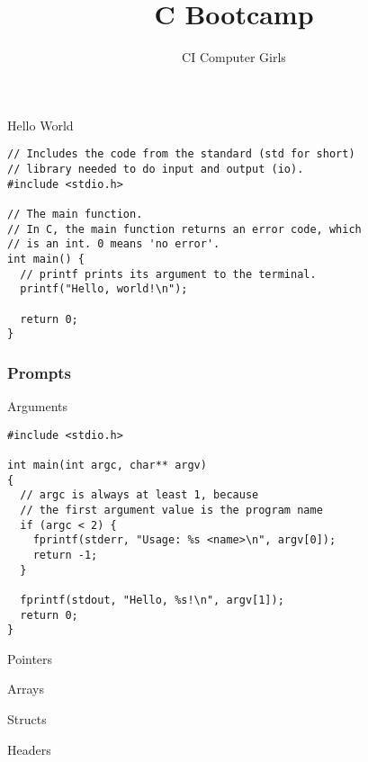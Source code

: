 \documentclass[pdf]{beamer}
\title{C Bootcamp}
\author{CI Computer Girls}
\begin{document}
\begin{frame}
  \titlepage%
\end{frame}

\begin{frame}[fragile]{Hello World}

\begin{verbatim}
// Includes the code from the standard (std for short)
// library needed to do input and output (io).
#include <stdio.h>

// The main function.
// In C, the main function returns an error code, which
// is an int. 0 means 'no error'.
int main() {
  // printf prints its argument to the terminal.
  printf("Hello, world!\n");

  return 0;
}
\end{verbatim}

\end{frame}

\begin{frame}
\frametitle{Prompts}

\end{frame}

\begin{frame}[fragile]{Arguments}

\begin{verbatim}
#include <stdio.h>

int main(int argc, char** argv)
{
  // argc is always at least 1, because
  // the first argument value is the program name
  if (argc < 2) {
    fprintf(stderr, "Usage: %s <name>\n", argv[0]);
    return -1;
  }

  fprintf(stdout, "Hello, %s!\n", argv[1]);
  return 0;
}
\end{verbatim}

\end{frame}

\begin{frame}{Pointers}

\end{frame}

\begin{frame}{Arrays}

\end{frame}

\begin{frame}{Structs}

\end{frame}

\begin{frame}{Headers}

\end{frame}
\end{document}
